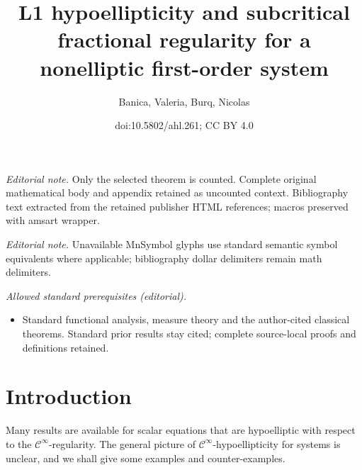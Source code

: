 \documentclass[10pt]{amsart}
\title{L1 hypoellipticity and subcritical fractional regularity for a nonelliptic first-order system}
\author{Banica, Valeria, Burq, Nicolas}
\date{doi:10.5802/ahl.261; CC BY 4.0}
\theoremstyle{definition}\newtheorem{defi}[theo]{Definition}\newtheorem{rema}[theo]{Remark}\newtheorem{exam}[theo]{Example}\newtheorem{exem}[theo]{Example}\newtheorem{nota}[theo]{Notation}
\newcommand{\clC}{\mathcal{C}}
\begin{document}
\maketitle
\noindent\textit{Editorial note.} Only the selected theorem is counted. Complete original mathematical body and appendix retained as uncounted context. Bibliography text extracted from the retained publisher HTML references; macros preserved with amsart wrapper.\par\medskip
\noindent\textit{Editorial note.} Unavailable MnSymbol glyphs use standard semantic symbol equivalents where applicable; bibliography dollar delimiters remain math delimiters.\par\medskip
\noindent\textit{Allowed standard prerequisites (editorial).}\begin{itemize}
\item Standard functional analysis, measure theory and the author-cited classical theorems. Standard prior results stay cited; complete source-local proofs and definitions retained.
\end{itemize}\medskip

\section{Introduction}

Many results are available for scalar equations that are hypoelliptic with respect to the $\clC^\infty$-regularity. The general picture of $\clC^\infty$-hypoellipticity for systems is unclear, and we shall give some examples and counter-examples.
\end{document}
